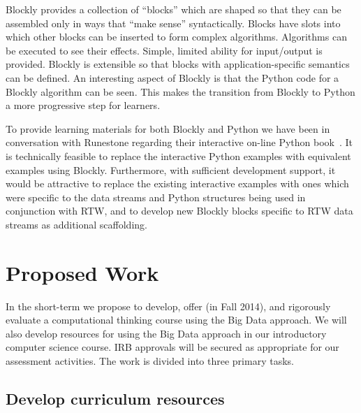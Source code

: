 \documentclass[11pt]{article}
\begin{document}
Blockly provides a collection of ``blocks'' which are shaped so that they can be assembled only in ways that ``make sense'' syntactically. Blocks have slots into which other blocks can be inserted to form complex algorithms. Algorithms can be executed to see their effects. Simple, limited ability for input/output is provided. Blockly is extensible so that blocks with application-specific semantics can be defined. An interesting aspect of Blockly is that the Python code for a Blockly algorithm can be seen. This makes the transition from Blockly to Python a more progressive step for learners.

To provide learning materials for both Blockly and Python we have been in conversation with Runestone regarding their interactive on-line Python book~\cite{runestone}. It is technically feasible to replace the interactive Python examples with equivalent examples using Blockly. Furthermore, with sufficient development support, it would be attractive to replace the existing interactive examples with ones which were specific to the data streams and Python structures being used in conjunction with RTW, and to develop new Blockly blocks specific to RTW data streams as additional scaffolding.


\section{Proposed Work}

In the short-term we propose to develop, offer (in Fall 2014), and
rigorously evaluate a computational thinking course using the Big Data
approach.
We will also develop resources for using the Big Data approach in
our introductory computer science course.
IRB approvals will be secured as appropriate for our assessment
activities.
The work is divided into three primary tasks.

\subsection{Develop curriculum resources}
\end{document}
